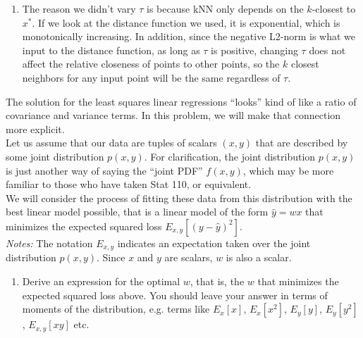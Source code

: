 \documentclass[submit]{harvardml}
\begin{document}
{\begin{framed}
\begin{enumerate}
    \item The reason we didn't vary $\tau$ is because kNN only depends on the $k$-closest to $x^*$. If we look at the distance function we used, it is exponential, which is monotonically increasing. In addition, since the negative L2-norm is what we input to the distance function, as long as $\tau$ is positive, changing $\tau$ does not affect the relative closeness of points to other points, so the $k$ closest neighbors for any input point will be the same regardless of $\tau$.
\end{enumerate}
\end{framed}
}
\newpage 


\begin{problem}

  The solution for the least squares linear regressions ``looks'' kind
  of like a ratio of covariance and variance terms.  In this problem,
  we will make that connection more explicit. \\

  \noindent Let us assume that our data are tuples of scalars $(x,y)$ that are
  described by some joint distribution $p(x,y)$.  For clarification, the joint distribution $p(x,y)$ is just another way of saying the ``joint PDF'' $f(x,y)$, which may be more familiar to those who have taken Stat 110, or equivalent. \\
  
  \noindent We will consider the process of fitting these data from this distribution with the best linear model
  possible, that is a linear model of the form $\hat{y} = wx$ that
  minimizes the expected squared loss $E_{x,y}[ ( y - \hat{y} )^2
  ]$.\\

\noindent \emph{Notes:} The notation $E_{x, y}$ indicates an
expectation taken over the joint distribution $p(x,y)$.  Since $x$ and
$y$ are scalars, $w$ is also a scalar.
  
  \begin{enumerate}

  \item Derive an expression for the optimal $w$, that is, the $w$
    that minimizes the expected squared loss above.  You should leave
    your answer in terms of moments of the distribution, e.g. terms
    like $E_x[x]$, $E_x[x^2]$, $E_y[y]$, $E_y[y^2]$, $E_{x,y}[xy]$
    etc.


\end{enumerate}
\end{problem}
\end{document}
